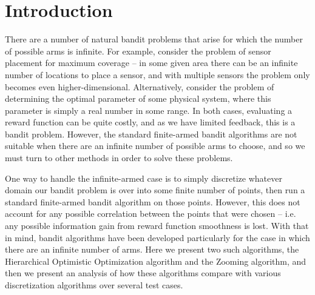 \section{Introduction}
There are a number of natural bandit problems that arise for which the
number of possible arms is infinite.  For example, consider the problem of
sensor placement for maximum coverage -- in some given area there can be an
infinite number of locations to place a sensor, and with multiple sensors the
problem only becomes even higher-dimensional.  Alternatively, consider the
problem of determining the optimal parameter of some physical system, where
this parameter is simply a real number in some range.  In both cases,
evaluating a reward function can be quite costly, and as we have limited
feedback, this is a bandit problem.  However, the standard finite-armed
bandit algorithms are not suitable when there are an infinite number of
possible arms to choose, and so we must turn to other methods in order to
solve these problems.

One way to handle the infinite-armed
case is to simply discretize whatever domain our bandit problem is over
into some finite number of points, then run a standard finite-armed bandit
algorithm on those points.  However, this does not account for any
possible correlation between the points that were chosen -- i.e. any possible
information gain from reward function smoothness is lost.  With that in
mind, bandit algorithms have been developed particularly for the case in
which there are an infinite number of arms.  Here we present two such
algorithms, the Hierarchical Optimistic Optimization algorithm and the
Zooming algorithm, and then we present an analysis of how these algorithms
compare with various discretization algorithms over several test cases.
